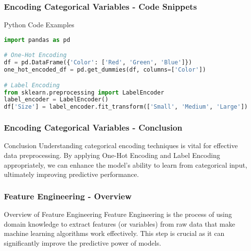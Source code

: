 \documentclass{beamer}
\begin{document}
\begin{frame}[fragile]
    \frametitle{Encoding Categorical Variables - Code Snippets}
    \begin{block}{Python Code Examples}
        \begin{lstlisting}[language=Python]
import pandas as pd

# One-Hot Encoding
df = pd.DataFrame({'Color': ['Red', 'Green', 'Blue']})
one_hot_encoded_df = pd.get_dummies(df, columns=['Color'])

# Label Encoding
from sklearn.preprocessing import LabelEncoder
label_encoder = LabelEncoder()
df['Size'] = label_encoder.fit_transform(['Small', 'Medium', 'Large'])
        \end{lstlisting}
    \end{block}
\end{frame}

\begin{frame}[fragile]
    \frametitle{Encoding Categorical Variables - Conclusion}
    \begin{block}{Conclusion}
        Understanding categorical encoding techniques is vital for effective data preprocessing. By applying One-Hot Encoding and Label Encoding appropriately, we can enhance the model’s ability to learn from categorical input, ultimately improving predictive performance.
    \end{block}
\end{frame}

\begin{frame}[fragile]
    \frametitle{Feature Engineering - Overview}
    \begin{block}{Overview of Feature Engineering}
        Feature Engineering is the process of using domain knowledge to extract features (or variables) from raw data that make machine learning algorithms work effectively. 
        This step is crucial as it can significantly improve the predictive power of models.
    \end{block}
\end{frame}
\end{document}
